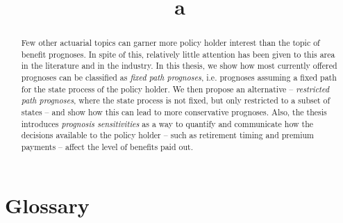 \documentclass{article}
\title{a} %
\newcommand{\1}[1]{\mathbbm{1}_{\left\lbrace #1 \right\rbrace}}
\theoremstyle{break}
\theoremstyle{remark}
\numberwithin{equation}{section}
\begin{document}
\maketitle

\begin{abstract}
	Few other actuarial topics can garner more policy holder interest than the topic of benefit prognoses. In spite of this, relatively little attention has been given to this area in the literature and in the industry. In this thesis, we show how most currently offered prognoses can be classified as \textit{fixed path prognoses}, i.e. prognoses assuming a fixed path for the state process of the policy holder. We then propose an alternative -- \textit{restricted path prognoses}, where the state process is not fixed, but only restricted to a subset of states -- and show how this can lead to more conservative prognoses. Also, the thesis introduces \textit{prognosis sensitivities} as a way to quantify and communicate how the decisions available to the policy holder -- such as retirement timing and premium payments -- affect the level of benefits paid out.
\end{abstract}

\newpage

\tableofcontents 

\newpage

\section{Glossary}
\end{document}

